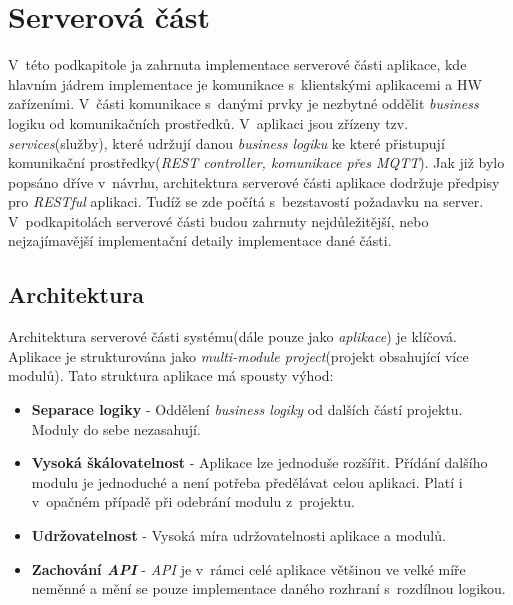 \section{Serverová část}
\label{impl:backend}
V~této podkapitole ja zahrnuta implementace serverové části aplikace, kde hlavním jádrem implementace je komunikace s~klientskými aplikacemi a HW zařízeními.
V~části komunikace s~danými prvky je nezbytné oddělit \emph{business} logiku od komunikačních prostředků.
V~aplikaci jsou zřízeny tzv. \emph{services}(služby), které udržují danou \emph{business logiku} ke které přistupují komunikační prostředky(\emph{REST controller, komunikace přes MQTT}).
Jak již bylo popsáno dříve v~návrhu, architektura serverové části aplikace dodržuje předpisy pro \emph{RESTful} aplikaci.
Tudíž se zde počítá s~bezstavostí požadavku na server.
V~podkapitolách serverové části budou zahrnuty nejdůležitější, nebo nejzajímavější implementační detaily implementace dané části.

\subsection*{Architektura}
\label{impl:backend:architektura}
Architektura serverové části systému(dále pouze jako \emph{aplikace}) je klíčová.
Aplikace je strukturována jako \emph{multi-module project}(projekt obsahující více modulů).
\newline
Tato struktura aplikace má spousty výhod:
\begin{itemize}
  \item \textbf{Separace logiky} - Oddělení \emph{business logiky} od dalších částí projektu. Moduly do sebe nezasahují.
  \item \textbf{Vysoká škálovatelnost} - Aplikace lze jednoduše rozšířit. Přídání dalšího modulu je jednoduché a není potřeba předělávat celou aplikaci. Platí i v~opačném případě při odebrání modulu z~projektu.
  \item \textbf{Udržovatelnost} - Vysoká míra udržovatelnosti aplikace a modulů.
  \item \textbf{Zachování \emph{API}} - \emph{API} je v~rámci celé aplikace většinou ve velké míře neměnné a mění se pouze implementace daného rozhraní s~rozdílnou logikou.
\end{itemize}

